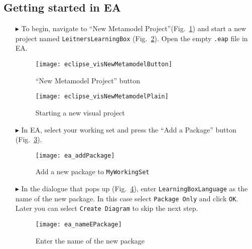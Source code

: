 \newpage
\hypertarget{static:starting vis}{}
\subsection{Getting started in EA}
\visHeader
  
\begin{itemize}

\item[$\blacktriangleright$]  To begin, navigate to ``New Metamodel Project''(Fig.~\ref{eclipse:newVisModelButton}) and start a new project named \texttt{Leit\-ners\-Learn\-ing\-Box} (Fig.~\ref{eclipse:newVisModel}). Open the empty \texttt{.eap} file in EA.

\vspace{0.5cm}

\begin{figure}[htbp]
	\centering
  \texttt{[image: eclipse\_visNewMetamodelButton]}
	\caption{``New Metamodel Project'' button}
	\label{eclipse:newVisModelButton}
\end{figure}
\begin{figure}[htbp]
	\centering
  \texttt{[image: eclipse\_visNewMetamodelPlain]}
	\caption{Starting a new visual project}
	\label{eclipse:newVisModel}
\end{figure}

\vspace{0.5cm}

\item[$\blacktriangleright$] In EA, select your working set and press the ``Add a Package'' button (Fig.~\ref{ea:newPackage}). 

\begin{figure}[htbp]
	\centering
  \texttt{[image: ea\_addPackage]}
	\caption{Add a new package to \texttt{MyWorkingSet}}
	\label{ea:newPackage}
	\vspace{0.5cm}
\end{figure}

\clearpage

\item[$\blacktriangleright$] In the dialogue that pops up (Fig.~\ref{ea:newPackageName}), enter \texttt{LearningBoxLanguage} as the name of the new
package. In this case select \texttt{Package Only} and click \texttt{OK}. Later you can select \texttt{Create Diagram} to skip the next step.

\vspace{0.5cm}

\begin{figure}[htbp]
	\centering
    \texttt{[image: ea\_nameEPackage]}
	\caption{Enter the name of the new package}
	\label{ea:newPackageName}
\end{figure}
\FloatBarrier


\end{itemize}
